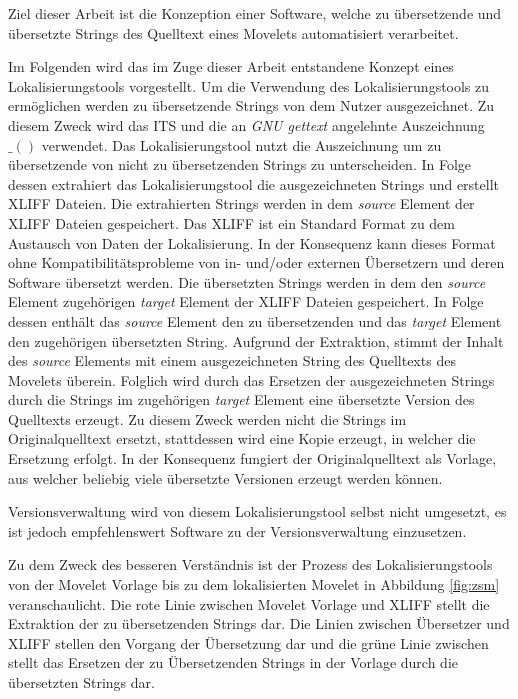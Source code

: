 Ziel dieser Arbeit ist die Konzeption einer Software, welche zu übersetzende und übersetzte Strings des Quelltext eines Movelets automatisiert verarbeitet.
\par
Im Folgenden wird das im Zuge dieser Arbeit entstandene Konzept eines Lokalisierungstools vorgestellt. Um die Verwendung des Lokalisierungstools zu ermöglichen werden zu übersetzende Strings von dem Nutzer ausgezeichnet. Zu diesem Zweck wird das \ac{ITS} und die an \textit{GNU gettext} angelehnte Auszeichnung $\_()$ verwendet. Das Lokalisierungstool nutzt die Auszeichnung um zu übersetzende von nicht zu übersetzenden Strings zu unterscheiden. In Folge dessen extrahiert das Lokalisierungstool die ausgezeichneten Strings und erstellt \ac{XLIFF} Dateien. Die extrahierten Strings werden in dem \textit{source} Element der \ac{XLIFF} Dateien gespeichert. Das \ac{XLIFF} ist ein Standard Format zu dem Austausch von Daten der Lokalisierung. 
\autocite{Schnabel.2014}
In der Konsequenz kann dieses Format ohne Kompatibilitätsprobleme von in- und/oder externen Übersetzern und deren Software übersetzt werden. Die übersetzten Strings werden in dem den \textit{source} Element zugehörigen \textit{target} Element der \ac{XLIFF} Dateien gespeichert. In Folge dessen enthält das \textit{source} Element den zu übersetzenden und das \textit{target} Element den zugehörigen übersetzten String. Aufgrund der Extraktion, stimmt der Inhalt des \textit{source} Elements mit einem ausgezeichneten String des Quelltexts des Movelets überein. Folglich wird durch das Ersetzen der ausgezeichneten Strings durch die Strings im zugehörigen \textit{target} Element eine übersetzte Version des Quelltexts erzeugt. Zu diesem Zweck werden nicht die Strings im Originalquelltext ersetzt, stattdessen wird eine Kopie erzeugt, in welcher die Ersetzung erfolgt. In der Konsequenz fungiert der Originalquelltext als Vorlage, aus welcher beliebig viele übersetzte Versionen erzeugt werden können. 
\par
Versionsverwaltung wird von diesem Lokalisierungstool selbst nicht umgesetzt, es ist jedoch empfehlenswert  Software zu der Versionsverwaltung einzusetzen.
\par
Zu dem Zweck des besseren Verständnis ist der Prozess des Lokalisierungstools von der Movelet Vorlage bis zu dem lokalisierten Movelet in Abbildung \ref{fig:zsm} veranschaulicht. Die rote Linie zwischen Movelet Vorlage und \ac{XLIFF} stellt die Extraktion der zu übersetzenden Strings dar. Die Linien zwischen Übersetzer und \ac{XLIFF} stellen den Vorgang der Übersetzung dar und die grüne Linie zwischen stellt das Ersetzen der zu Übersetzenden Strings in der Vorlage durch die übersetzten Strings dar.
